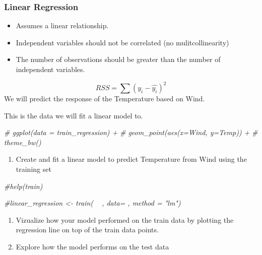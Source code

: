 \documentclass[11pt,]{article}
\newenvironment{Shaded}{\begin{snugshade}}{\end{snugshade}}
\newcommand{\CommentTok}[1]{\textcolor[rgb]{0.56,0.35,0.01}{\textit{#1}}}
\providecommand{\tightlist}{%
  \setlength{\itemsep}{0pt}\setlength{\parskip}{0pt}}
\begin{document}
\hypertarget{linear-regression}{%
\subsubsection{Linear Regression}\label{linear-regression}}

\begin{itemize}
\tightlist
\item
  Assumes a linear relationship.
\item
  Independent variables should not be correlated (no mulitcollinearity)
\item
  The number of observations should be greater than the number of
  independent variables.
\end{itemize}

\[RSS=\sum(y_i - \hat{y_i})^2\] We will predict the response of the
Temperature based on Wind.

This is the data we will fit a linear model to.

\begin{Shaded}
\begin{Highlighting}[]
\CommentTok{# ggplot(data = train_regression) +}
\CommentTok{#   geom_point(aes(x=Wind, y=Temp)) +}
\CommentTok{#   theme_bw()}
\end{Highlighting}
\end{Shaded}

\begin{enumerate}
\def\labelenumi{\arabic{enumi}.}
\setcounter{enumi}{1}
\tightlist
\item
  Create and fit a linear model to predict Temperature from Wind using
  the training set
\end{enumerate}

\begin{Shaded}
\begin{Highlighting}[]
\CommentTok{#help(train)}

\CommentTok{#linear_regression <- train( ~ , data= , method = "lm")}
\end{Highlighting}
\end{Shaded}

\begin{enumerate}
\def\labelenumi{\arabic{enumi}.}
\setcounter{enumi}{2}
\item
  Vizualize how your model performed on the train data by plotting the
  regression line on top of the train data points.
\item
  Explore how the model performs on the test data
\end{enumerate}
\end{document}
